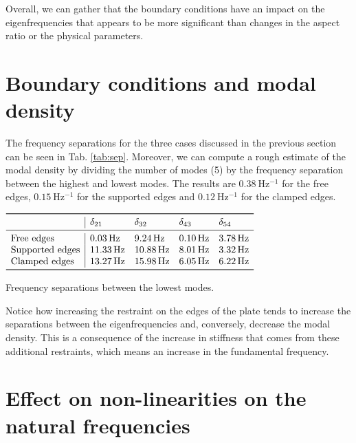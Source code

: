 \documentclass[a4paper]{article}
\begin{document}

Overall, we can gather that the boundary conditions have an impact on the eigenfrequencies that appears to be more significant than changes in the aspect ratio or the physical parameters.

\section{Boundary conditions and modal density}

The frequency separations for the three cases discussed in the previous section can be seen in Tab. \ref{tab:sep}. 
Moreover, we can compute a rough estimate of the modal density by dividing the number of modes (5) by the frequency separation between the highest and lowest modes. The results are $0.38~\si{\hertz^{-1}}$ for the free edges, $0.15~\si{\hertz^{-1}}$ for the supported edges and $0.12~\si{\hertz^{-1}}$ for the clamped edges.

\begin{table}[h]
		\centering
		$\begin{array}{l|llll}
			\toprule
			 & \delta_{21} & \delta_{32} & \delta_{43} & \delta_{54}\\
			\midrule
			\text{Free edges} & \SI{0.03}{\hertz} & \SI{9.24}{\hertz} & \SI{0.10}{\hertz}  & \SI{3.78}{\hertz}\\
			\text{Supported edges} & \SI{11.33}{\hertz}  & \SI{10.88}{\hertz}  &  \SI{8.01}{\hertz}  &  \SI{3.32}{\hertz}\\
			\text{Clamped edges} & \SI{13.27}{\hertz} &  \SI{15.98}{\hertz}  &  \SI{6.05}{\hertz}  &  \SI{6.22}{\hertz}\\
			\bottomrule
		\end{array}$
		\caption{Frequency separations between the lowest modes.}
		\label{tab:sep}
\end{table}

Notice how increasing the restraint on the edges of the plate tends to increase the separations between the eigenfrequencies and, conversely, decrease the modal density. This is a consequence of the increase in stiffness that comes from these additional restraints, which means an increase in the fundamental frequency.


\section{Effect on non-linearities on the natural frequencies}
\end{document}
